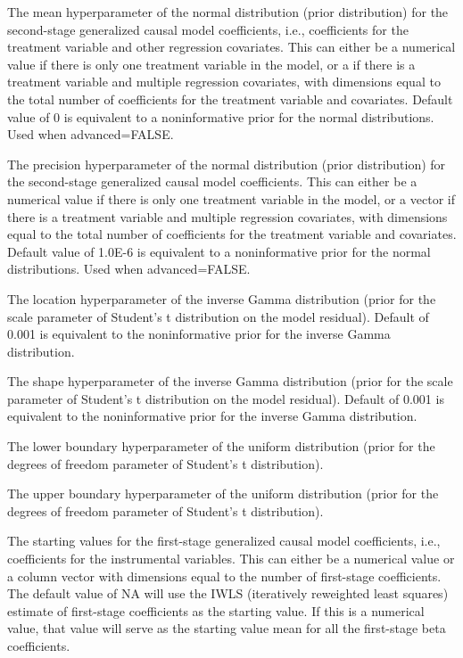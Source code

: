 \documentclass[a4paper]{book}
\begin{document}
\begin{Arguments}
\begin{ldescription}
\item[\code{g0}] The mean hyperparameter of the normal distribution (prior distribution)
for the second-stage generalized causal model coefficients,
i.e., coefficients for the treatment variable and other regression covariates.
This can either be a numerical value if there is only one treatment variable in the model,
or a if there is a treatment variable and multiple regression covariates,
with dimensions equal to the total number of coefficients for the treatment variable and covariates.
Default value of 0 is equivalent to a noninformative prior for the normal distributions.
Used when advanced=FALSE.

\item[\code{G0}] The precision hyperparameter of the normal distribution (prior distribution)
for the second-stage generalized causal model coefficients.
This can either be a numerical value if there is only one treatment variable in the model,
or a vector if there is a treatment variable and multiple regression covariates,
with dimensions equal to the total number of coefficients for the treatment variable and covariates.
Default value of 1.0E-6 is equivalent to a noninformative prior for the normal distributions.
Used when advanced=FALSE.

\item[\code{e0}] The location hyperparameter of the inverse Gamma distribution (prior for the scale parameter
of Student's t distribution on the model residual).
Default of 0.001 is equivalent to the noninformative prior for the inverse Gamma distribution.

\item[\code{E0}] The shape hyperparameter of the inverse Gamma distribution (prior for the scale parameter
of Student's t distribution on the model residual).
Default of 0.001 is equivalent to the noninformative prior for the inverse Gamma distribution.

\item[\code{v0}] The lower boundary hyperparameter of the uniform distribution (prior for the degrees of freedom
parameter of Student's t distribution).

\item[\code{V0}] The upper boundary hyperparameter of the uniform distribution (prior for the degrees of freedom
parameter of Student's t distribution).

\item[\code{beta.start}] The starting values for the first-stage generalized causal model coefficients,
i.e., coefficients for the instrumental variables.
This can either be a numerical value or a column vector with dimensions
equal to the number of first-stage coefficients.
The default value of NA will use the IWLS (iteratively reweighted least squares) estimate
of first-stage coefficients as the starting value.
If this is a numerical value, that value will
serve as the starting value mean for all the first-stage beta coefficients.


\end{ldescription}
\end{Arguments}
\end{document}
